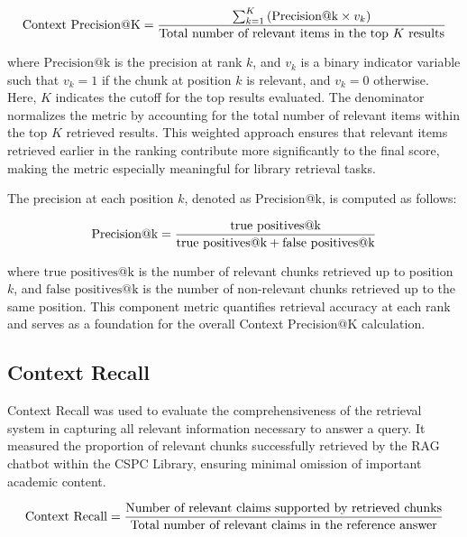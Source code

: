 \begin{refsection}
\begin{equation}
\centering
\text{Context Precision@K} = 
\frac{
    \sum_{k=1}^{K} \left( \text{Precision@k} \times v_k \right)
}{
    \text{Total number of relevant items in the top } K \text{ results}
}
\end{equation}

where $\text{Precision@k}$ is the precision at rank $k$, and $v_k$ is a binary indicator variable such that $v_k = 1$ if the chunk at position $k$ is relevant, and $v_k = 0$ otherwise. Here, $K$ indicates the cutoff for the top results evaluated. The denominator normalizes the metric by accounting for the total number of relevant items within the top $K$ retrieved results. This weighted approach ensures that relevant items retrieved earlier in the ranking contribute more significantly to the final score, making the metric especially meaningful for library retrieval tasks.

The precision at each position $k$, denoted as Precision@k, is computed as follows:

\begin{equation}
\centering
\text{Precision@k} = 
\frac{
    \text{true positives@k}
}{
    \text{true positives@k} + \text{false positives@k}
}
\end{equation}

where $\text{true positives@k}$ is the number of relevant chunks retrieved up to position $k$, and $\text{false positives@k}$ is the number of non-relevant chunks retrieved up to the same position. This component metric quantifies retrieval accuracy at each rank and serves as a foundation for the overall Context Precision@K calculation.

\subsection*{Context Recall}

Context Recall was used to evaluate the comprehensiveness of the retrieval system in capturing all relevant information necessary to answer a query. It measured the proportion of relevant chunks successfully retrieved by the RAG chatbot within the CSPC Library, ensuring minimal omission of important academic content.

\begin{equation}
\centering
\text{Context Recall} = \frac{\text{Number of relevant claims supported by retrieved chunks}}{\text{Total number of relevant claims in the reference answer}}
\end{equation}


\end{refsection}
